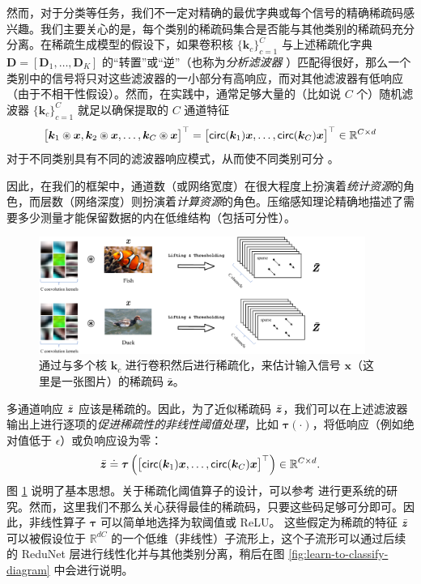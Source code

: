 \documentclass[../../book-main.tex]{subfiles}
\begin{document}
然而，对于分类等任务，我们不一定对精确的最优字典或每个信号的精确稀疏码感兴趣。我们主要关心的是，每个类别的稀疏码集合是否能与其他类别的稀疏码充分分离。在稀疏生成模型的假设下，如果卷积核 $\{\bm k_c\}_{c=1}^C$ 与上述稀疏化字典 $\bm D = [\bm D_1, \ldots, \bm D_K]$ 的“转置”或“逆”（也称为{\em 分析滤波器} \cite{Cosparse-Nam,Analysis-Filter}）匹配得很好，那么一个类别中的信号将只对这些滤波器的一小部分有高响应，而对其他滤波器有低响应（由于不相干性假设）。然而，在实践中，通常足够大量的（比如说 $C$ 个）随机滤波器 $\{\bm k_c\}_{c=1}^C$ 就足以确保提取的 $C$ 通道特征
\begin{equation}
\big[\bm k_1 \circledast \bm{x}, \bm k_2 \circledast \bm{x}, \ldots, \bm k_C \circledast \bm{x}\big]^\top = \big[\mathsf{circ}(\bm k_1) \bm{x}, \ldots, \mathsf{circ}(\bm k_C) \bm{x} \big]^\top \in \mathbb{R}^{C\times d}
\end{equation}
对于不同类别具有不同的滤波器响应模式，从而使不同类别可分 \cite{chan2015pcanet}。

因此，在我们的框架中，通道数（或网络宽度）在很大程度上扮演着{\em 统计资源}的角色，而层数（网络深度）则扮演着{\em 计算资源}的角色。压缩感知理论精确地描述了需要多少测量才能保留数据的内在低维结构（包括可分性）\cite{Wright-Ma-2021}。%

\begin{figure}[t]
	\centerline{
\includegraphics[width=0.95\textwidth]{figs_chap4/sparse-lifting.pdf}}
\caption{通过与多个核 $\bm k_c$ 进行卷积然后进行稀疏化，来估计输入信号 $\bm x$（这里是一张图片）的稀疏码 $\bar{\bm z}$。}
		\label{fig:multi-channel-sparse-lifting}
\end{figure}
多通道响应 $\bar {\bm{z}}$ 应该是稀疏的。因此，为了近似稀疏码 $\bar {\bm{z}}$，我们可以在上述滤波器输出上进行逐项的{\em 促进稀疏性的非线性阈值处理}，比如 $\bm \tau(\cdot)$，将低响应（例如绝对值低于 $\epsilon$）或负响应设为零：
\begin{equation}
\bar {\bm{z}} \doteq \bm \tau \left( \big[\mathsf{circ}(\bm k_1) \bm{x}, \ldots, \mathsf{circ}(\bm k_C) \bm{x} \big]^\top \right) \in \mathbb{R}^{C \times d}.
\label{eqn:sparse-lifting}
\end{equation}
图 \ref{fig:multi-channel-sparse-lifting} 说明了基本思想。关于稀疏化阈值算子的设计，可以参考 \cite{Analysis-Filter} 进行更系统的研究。然而，这里我们不那么关心获得最佳的稀疏码，只要这些码足够可分即可。因此，非线性算子 $\bm \tau$ 可以简单地选择为软阈值或 ReLU。
这些假定为稀疏的特征 $\bar {\bm{z}}$ 可以被假设位于 $\mathbb{R}^{dC}$ 的一个低维（非线性）子流形上，这个子流形可以通过后续的 ReduNet 层进行线性化并与其他类别分离，稍后在图 \ref{fig:learn-to-classify-diagram} 中会进行说明。
\end{document}
